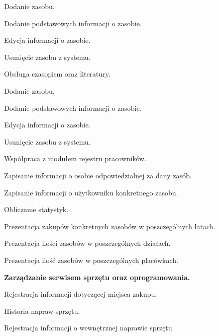 \begin{myEnumerate}
\begin{myEnumerate}
\begin{myEnumerate}
		\item Dodanie zasobu.
		\begin{myEnumerate}
			\item Dodanie podstawowych informacji o zasobie.
		\end{myEnumerate}
		\item Edycja informacji o zasobie.
		\item Usunięcie zasobu z systemu.
	\end{myEnumerate}
	\item Obsługa czasopism oraz literatury.
	\begin{myEnumerate}
		\item Dodanie zasobu.
		\begin{myEnumerate}
			\item Dodanie podstawowych informacji o zasobie.
		\end{myEnumerate}
		\item Edycja informacji o zasobie.
		\item Usunięcie zasobu z systemu.
	\end{myEnumerate}
	\item Współpraca z modułem rejestru pracowników.
	\begin{myEnumerate}
	\item Zapisanie informacji o osobie odpowiedzialnej za dany zasób.
	\item Zapisanie informacji o użytkowniku konkretnego zasobu.
	\end{myEnumerate}
	\item Obliczanie statystyk.
	\begin{myEnumerate}
	\item Prezentacja zakupów konkretnych zasobów w poszczególnych latach.
	\item Prezentacja ilości zasobów w poszczególnych działach.
	\item Prezentacja ilość zasobów w poszczególnych placówkach.
	\end{myEnumerate}
	\end{myEnumerate}
\item \textbf{Zarządzanie serwisem sprzętu oraz oprogramowania.}
	\begin{myEnumerate}
		\item Rejestracja informacji dotyczącej miejsca zakupu.
		\item Historia napraw sprzętu.
			\begin{myEnumerate}
			\item Rejestracja informacji o wewnętrznej naprawie sprzętu.

\end{myEnumerate}
\end{myEnumerate}
\end{myEnumerate}
